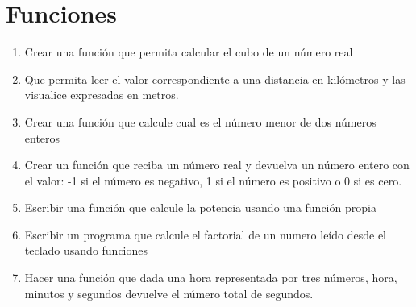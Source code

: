 \chapter{Funciones}

 \begin{enumerate}[resume]

  \item Crear una función que permita calcular el cubo de un número real

  \item Que permita leer el valor correspondiente a una distancia en kilómetros y las visualice expresadas en metros.

  \item Crear una función que calcule cual es el número menor de dos números enteros

  \item Crear un función que reciba un número real y devuelva un número entero con el valor: -1 si el número es negativo, 1 si el número es positivo o 0 si es cero.

  \item Escribir una función que calcule la potencia usando una función propia

  \item Escribir un programa que calcule el factorial de un numero leído desde el teclado usando funciones

  \item Hacer una función   que dada una hora representada por tres números, hora, minutos y segundos devuelve el número total de segundos.
  
  
  




\end{enumerate}

